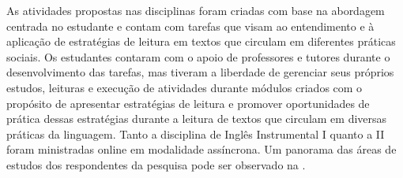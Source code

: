 \documentclass[portuguese]{textolivre}
\begin{document}
As atividades propostas nas disciplinas foram criadas com base na abordagem centrada no estudante e contam com tarefas que visam ao entendimento e à aplicação de estratégias de leitura em textos que circulam em diferentes práticas sociais. Os estudantes contaram com o apoio de professores e tutores durante o desenvolvimento das tarefas, mas tiveram a liberdade de gerenciar seus próprios estudos, leituras e execução de atividades durante módulos criados com o propósito de apresentar estratégias de leitura e promover oportunidades de prática dessas estratégias durante a leitura de textos que circulam em diversas práticas da linguagem. Tanto a disciplina de Inglês Instrumental I quanto a II foram ministradas online em modalidade assíncrona. Um panorama das áreas de estudos dos respondentes da pesquisa pode ser observado na .
\end{document}
